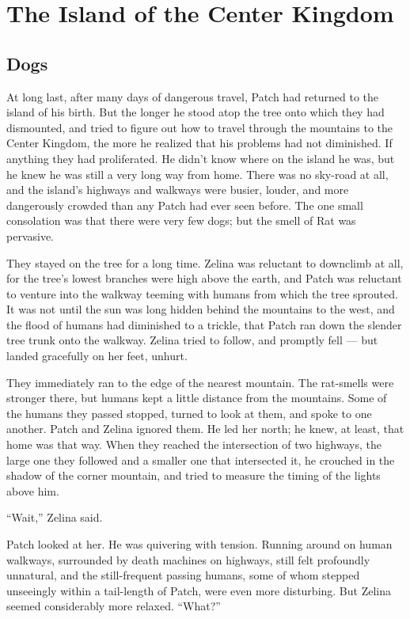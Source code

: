 \documentclass[ebook,oneside,openany,12pt]{memoir}
\begin{document}

\chapter{The Island of the Center Kingdom}

\section{Dogs}

At long last, after many days of dangerous travel, Patch had returned
to the island of his birth. But the longer he stood atop the tree onto
which they had dismounted, and tried to figure out how to travel
through the mountains to the Center Kingdom, the more he realized that
his problems had not diminished. If anything they had proliferated. He
didn’t know where on the island he was, but he knew he was still a
very long way from home. There was no sky-road at all, and the
island’s highways and walkways were busier, louder, and more
dangerously crowded than any Patch had ever seen before. The one small
consolation was that there were very few dogs; but the smell of Rat
was pervasive.

They stayed on the tree for a long time. Zelina was reluctant to
downclimb at all, for the tree’s lowest branches were high above the
earth, and Patch was reluctant to venture into the walkway teeming
with humans from which the tree sprouted. It was not until the sun was
long hidden behind the mountains to the west, and the flood of humans
had diminished to a trickle, that Patch ran down the slender tree
trunk onto the walkway. Zelina tried to follow, and promptly fell —
but landed gracefully on her feet, unhurt.

They immediately ran to the edge of the nearest mountain. The
rat-smells were stronger there, but humans kept a little distance from
the mountains. Some of the humans they passed stopped, turned to look
at them, and spoke to one another. Patch and Zelina ignored them. He
led her north; he knew, at least, that home was that way. When they
reached the intersection of two highways, the large one they followed
and a smaller one that intersected it, he crouched in the shadow of
the corner mountain, and tried to measure the timing of the lights
above him.

“Wait,” Zelina said.

Patch looked at her. He was quivering with tension. Running around on
human walkways, surrounded by death machines on highways, still felt
profoundly unnatural, and the still-frequent passing humans, some of
whom stepped unseeingly within a tail-length of Patch, were even more
disturbing. But Zelina seemed considerably more relaxed. “What?”
\end{document}
